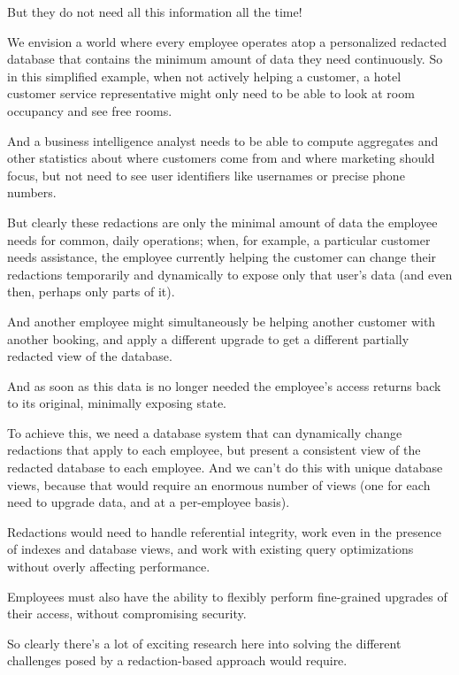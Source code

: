 But they do not need all this information all the time!


We envision a world where every employee operates atop a personalized redacted
database that contains the minimum amount of data they need continuously. So in
this simplified example, when not actively helping a customer, a hotel customer
service representative might only need to be able to look at room occupancy and
see free rooms.

And a business intelligence analyst needs to be able to compute aggregates and
other statistics about where customers come from and where marketing should
focus, but not need to see user identifiers like usernames or precise phone
numbers.


But clearly these redactions are only the minimal amount of data the employee
needs for common, daily operations; when, for example, a particular customer
needs assistance, the employee currently helping the customer can change their
redactions temporarily and dynamically to expose only that user’s data (and even
then, perhaps only parts of it).

And another employee might simultaneously be helping another customer with
another booking, and apply a different upgrade to get a different partially
redacted view of the database.

And as soon as this data is no longer needed the employee’s access returns back
to its original, minimally exposing state.

To achieve this, we need a database system that can dynamically change
redactions that apply to each employee, but present a consistent view of the
redacted database to each employee.  And we can’t do this with unique database
views, because that would require an enormous number of views (one for each need
to upgrade data, and at a per-employee basis).

Redactions would need to handle referential integrity, work even in the presence
of indexes and database views, and work with existing query optimizations
without overly affecting performance.

Employees must also have the ability to flexibly perform fine-grained upgrades
of their access, without compromising security.

So clearly there’s a lot of exciting research here into solving the different
challenges posed by a redaction-based approach would require.


